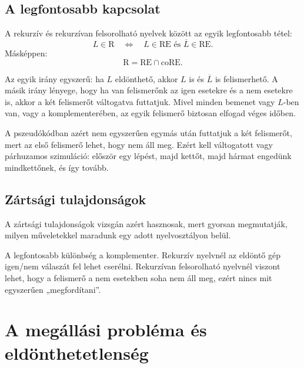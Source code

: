 \subsection{A legfontosabb kapcsolat}

A rekurzív és rekurzívan felsorolható nyelvek között az egyik legfontosabb tétel:
\[
  L\in\mathrm{R}
  \quad\Longleftrightarrow\quad
  L\in\mathrm{RE}\text{ és }\overline L\in\mathrm{RE}.
\]
Másképpen:
\[
  \mathrm{R}=\mathrm{RE}\cap\mathrm{coRE}.
\]

Az egyik irány egyszerű: ha $L$ eldönthető, akkor $L$ is és $\overline L$ is felismerhető. A másik irány lényege, hogy ha van felismerőnk az igen esetekre és a nem esetekre is, akkor a két felismerőt váltogatva futtatjuk. Mivel minden bemenet vagy $L$-ben van, vagy a komplementerében, az egyik felismerő biztosan elfogad véges időben.




A pszeudókódban azért nem egyszerűen egymás után futtatjuk a két felismerőt, mert az első felismerő lehet, hogy nem áll meg. Ezért kell váltogatott vagy párhuzamos szimuláció: először egy lépést, majd kettőt, majd hármat engedünk mindkettőnek, és így tovább.

\subsection{Zártsági tulajdonságok}

A zártsági tulajdonságok vizsgán azért hasznosak, mert gyorsan megmutatják, milyen műveletekkel maradunk egy adott nyelvosztályon belül.

\begin{center}

\end{center}

A legfontosabb különbség a komplementer. Rekurzív nyelvnél az eldöntő gép igen/nem válaszát fel lehet cserélni. Rekurzívan felsorolható nyelvnél viszont lehet, hogy a felismerő a nem esetekben soha nem áll meg, ezért nincs mit egyszerűen „megfordítani”.

\section{A megállási probléma és eldönthetetlenség}

